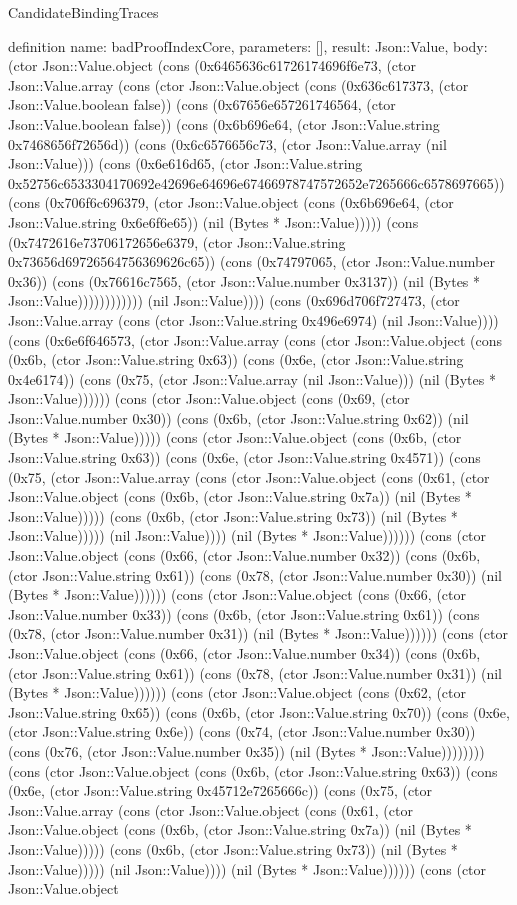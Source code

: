 \begin{lexlean}{CandidateBindingTraces}
\begin{semanticmodule}
definition{
 name: badProofIndexCore,
 parameters: [],
 result: Json::Value,
 body: (ctor Json::Value.object (cons (0x6465636c61726174696f6e73, (ctor Json::Value.array (cons (ctor Json::Value.object (cons (0x636c617373, (ctor Json::Value.boolean false)) (cons (0x67656e657261746564, (ctor Json::Value.boolean false)) (cons (0x6b696e64, (ctor Json::Value.string 0x7468656f72656d)) (cons (0x6c6576656c73, (ctor Json::Value.array (nil Json::Value))) (cons (0x6e616d65, (ctor Json::Value.string 0x52756c6533304170692e42696e64696e67466978747572652e7265666c6578697665)) (cons (0x706f6c696379, (ctor Json::Value.object (cons (0x6b696e64, (ctor Json::Value.string 0x6e6f6e65)) (nil (Bytes * Json::Value))))) (cons (0x7472616e73706172656e6379, (ctor Json::Value.string 0x73656d69726564756369626c65)) (cons (0x74797065, (ctor Json::Value.number 0x36)) (cons (0x76616c7565, (ctor Json::Value.number 0x3137)) (nil (Bytes * Json::Value)))))))))))) (nil Json::Value)))) (cons (0x696d706f727473, (ctor Json::Value.array (cons (ctor Json::Value.string 0x496e6974) (nil Json::Value)))) (cons (0x6e6f646573, (ctor Json::Value.array (cons (ctor Json::Value.object (cons (0x6b, (ctor Json::Value.string 0x63)) (cons (0x6e, (ctor Json::Value.string 0x4e6174)) (cons (0x75, (ctor Json::Value.array (nil Json::Value))) (nil (Bytes * Json::Value)))))) (cons (ctor Json::Value.object (cons (0x69, (ctor Json::Value.number 0x30)) (cons (0x6b, (ctor Json::Value.string 0x62)) (nil (Bytes * Json::Value))))) (cons (ctor Json::Value.object (cons (0x6b, (ctor Json::Value.string 0x63)) (cons (0x6e, (ctor Json::Value.string 0x4571)) (cons (0x75, (ctor Json::Value.array (cons (ctor Json::Value.object (cons (0x61, (ctor Json::Value.object (cons (0x6b, (ctor Json::Value.string 0x7a)) (nil (Bytes * Json::Value))))) (cons (0x6b, (ctor Json::Value.string 0x73)) (nil (Bytes * Json::Value))))) (nil Json::Value)))) (nil (Bytes * Json::Value)))))) (cons (ctor Json::Value.object (cons (0x66, (ctor Json::Value.number 0x32)) (cons (0x6b, (ctor Json::Value.string 0x61)) (cons (0x78, (ctor Json::Value.number 0x30)) (nil (Bytes * Json::Value)))))) (cons (ctor Json::Value.object (cons (0x66, (ctor Json::Value.number 0x33)) (cons (0x6b, (ctor Json::Value.string 0x61)) (cons (0x78, (ctor Json::Value.number 0x31)) (nil (Bytes * Json::Value)))))) (cons (ctor Json::Value.object (cons (0x66, (ctor Json::Value.number 0x34)) (cons (0x6b, (ctor Json::Value.string 0x61)) (cons (0x78, (ctor Json::Value.number 0x31)) (nil (Bytes * Json::Value)))))) (cons (ctor Json::Value.object (cons (0x62, (ctor Json::Value.string 0x65)) (cons (0x6b, (ctor Json::Value.string 0x70)) (cons (0x6e, (ctor Json::Value.string 0x6e)) (cons (0x74, (ctor Json::Value.number 0x30)) (cons (0x76, (ctor Json::Value.number 0x35)) (nil (Bytes * Json::Value)))))))) (cons (ctor Json::Value.object (cons (0x6b, (ctor Json::Value.string 0x63)) (cons (0x6e, (ctor Json::Value.string 0x45712e7265666c)) (cons (0x75, (ctor Json::Value.array (cons (ctor Json::Value.object (cons (0x61, (ctor Json::Value.object (cons (0x6b, (ctor Json::Value.string 0x7a)) (nil (Bytes * Json::Value))))) (cons (0x6b, (ctor Json::Value.string 0x73)) (nil (Bytes * Json::Value))))) (nil Json::Value)))) (nil (Bytes * Json::Value)))))) (cons (ctor Json::Value.object }
\end{semanticmodule}
\end{lexlean}
